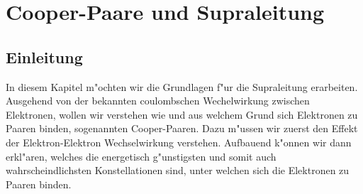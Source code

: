 \chapter{Cooper-Paare und Supraleitung\label{chapter:supraleitung}}
\begin{refsection}




\newpage
\section{Einleitung}
In diesem Kapitel m"ochten wir die Grundlagen f"ur die Supraleitung erarbeiten. Ausgehend von der bekannten coulombschen Wechelwirkung zwischen Elektronen, wollen wir verstehen wie und aus welchem Grund sich Elektronen zu Paaren binden, sogenannten Cooper-Paaren. Dazu m"ussen wir zuerst den Effekt der Elektron-Elektron Wechselwirkung verstehen. Aufbauend k"onnen wir dann erkl"aren, welches die energetisch g"unstigsten und somit auch wahrscheindlichsten Konstellationen sind, unter welchen sich die Elektronen zu Paaren binden.


\end{refsection}

